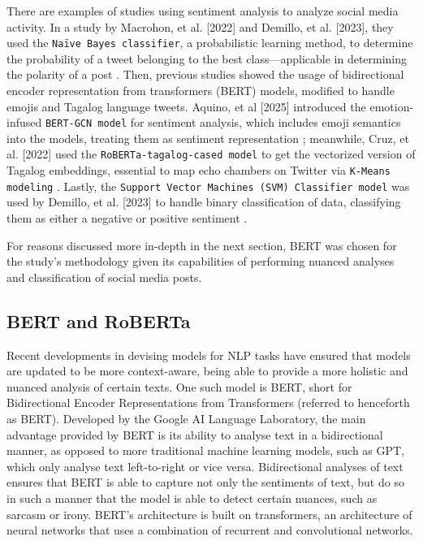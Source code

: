 There are examples of studies using sentiment analysis to analyze social media activity. In a study by Macrohon, et al. [2022] and Demillo, et al. [2023], they used the \texttt{Naïve Bayes classifier}, a probabilistic learning method, to determine the probability of a tweet belonging to the best class—applicable in determining the polarity of a post \cite{RRL_Macrohon-2022,RRL_Demillo-2025}. Then, previous studies showed the usage of bidirectional encoder representation from transformers (BERT) models, modified to handle emojis and Tagalog language tweets. Aquino, et al [2025] introduced the emotion-infused \texttt{BERT-GCN model} for sentiment analysis, which includes emoji semantics into the models, treating them as sentiment representation  \cite{RRL_Aquino-2025}; meanwhile, Cruz, et al. [2022] used the \texttt{RoBERTa-tagalog-cased model} to get the vectorized version of Tagalog embeddings, essential to map echo chambers on Twitter via \texttt{K-Means modeling} \cite{RRL_Cruz-2022}. Lastly, the \texttt{Support Vector Machines (SVM) Classifier model} was used by Demillo, et al. [2023] to handle binary classification of data, classifying them as either a negative or positive sentiment \cite{RRL_Demillo-2025}.

For reasons discussed more in-depth in the next section, BERT was chosen for the study’s methodology given its capabilities of performing nuanced analyses and classification of social media posts.

\subsection{BERT and RoBERTa}
Recent developments in devising models for NLP tasks have ensured that models are updated to be more context-aware, being able to provide a more holistic and nuanced analysis of certain texts. One such model is BERT, short for Bidirectional Encoder Representations from Transformers (referred to henceforth as BERT). Developed by the Google AI Language Laboratory, the main advantage provided by BERT is its ability to analyse text in a bidirectional manner, as opposed to more traditional machine learning models, such as GPT, which only analyse text left-to-right or vice versa. Bidirectional analyses of text ensures that BERT is able to capture not only the sentiments of text, but do so in such a manner that the model is able to detect certain nuances, such as sarcasm or irony. BERT’s architecture is built on transformers, an architecture of neural networks that uses a combination of recurrent and convolutional networks.

